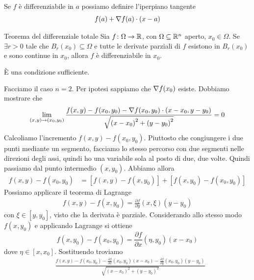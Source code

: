 \documentclass[a4paper]{article}
\begin{document}
\begin{radioactive}
Se \(f\) è differenziabile in \(a\) possiamo definire l'iperpiano tangente
\[
    f(a) + \nabla f(a) \cdot (x-a)
\]
\end{radioactive}

\begin{radioactive}
\begin{snippettheorem}{Teorema del differenziale totale}
    Sia \(f \colon \Omega \to \mathbb{R}\), con \(\Omega \subseteq \mathbb{R}^n\) aperto,
    \(x_0 \in \Omega\). Se \(\exists r > 0\)
    tale che \(B_r(x_0) \subseteq \Omega\) e tutte le derivate parziali di \(f\)
    esistono in \(B_r(x_0)\) e sono continue in \(x_0\),
    allora \(f\) è differenziabile in \(x_0\).
\end{snippettheorem}
È una condizione sufficiente.
\begin{snippetproof}{}
    Facciamo il caso \(n=2\).
    Per ipotesi sappiamo che \(\nabla f(x_0)\) esiste.
    Dobbiamo mostrare che
    \[
        \lim_{(x,y) \to (x_0,y_0)} \frac{
            f(x,y) - f(x_0, y_0) - \nabla f(x_0,y_0) \cdot (x-x_0, y-y_0)
        }{\sqrt{{(x-x_0)}^2 + {(y-y_0)}^2}} = 0
    \]
    Calcoliamo l'incremento \(f(x,y) - f(x_0, y_0)\). Piuttosto che congiungere
    i due punti mediante un segmento, facciamo lo stesso percorso con due segmenti nelle direzioni degli assi,
    quindi ho una variabile sola al posto di due, due volte. Quindi passiamo dal punto intermedio
    \((x,y_0)\). Abbiamo allora
    \begin{align*}
        f(x,y) - f(x_0, y_0) &= \left[
            f(x,y) - f(x,y_0)
        \right] + \left[
            f(x,y_0) - f(x_0,y_0)
        \right]
    \end{align*}
    Possiamo applicare il teorema di Lagrange
    \begin{align*}
        f(x,y) - f(x,y_0) = \frac{\partial f}{\partial y}(x, \xi) (y-y_0)
    \end{align*}
    con \(\xi \in [y, y_0]\), visto che la derivata è parziale.
    Considerando allo stesso modo \(f(x, y_0)\) e applicando Lagrange si ottiene
    \[
        f(x, y_0) - f(x_0, y_0) = \frac{\partial f}{\partial x}(\eta, y_0)(x-x_0)
    \]
    dove \(\eta \in [x, x_0]\). Sostituendo troviamo
    \begin{align*}
        &\frac{
            f(x,y) - f(x_0, y_0) - \frac{\partial f}{\partial x}(x_0, y_0)(x-x_0)
            - \frac{\partial f}{\partial y}(x_0, y_0)(y-y_0)
        }{
            \sqrt{
                {(x-x_0)}^2 + {(y-y_0)}^2
}}
\end{align*}
\end{snippetproof}
\end{radioactive}
\end{document}

